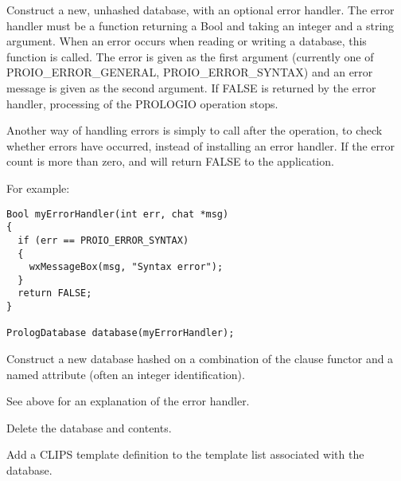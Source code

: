 

Construct a new, unhashed database, with an optional error handler. The
error handler must be a function returning a Bool and taking an integer and a string
argument. When an error occurs when reading or writing a database, this function is
called. The error is given as the first argument (currently one of PROIO\_ERROR\_GENERAL,
PROIO\_ERROR\_SYNTAX) and an error message is given as the second argument. If FALSE
is returned by the error handler, processing of the PROLOGIO operation stops.

Another way of handling errors is simply to call  after
the operation, to check whether errors have occurred, instead of installing an error handler.
If the error count is more than zero,  and  will return FALSE to
the application.

For example:

\begin{verbatim}
Bool myErrorHandler(int err, chat *msg)
{
  if (err == PROIO_ERROR_SYNTAX)
  {
    wxMessageBox(msg, "Syntax error");
  }
  return FALSE;
}

PrologDatabase database(myErrorHandler);
\end{verbatim}



Construct a new database hashed on a combination of the clause functor and
a named attribute (often an integer identification).

See above for an explanation of the error handler.



Delete the database and contents.



Add a CLIPS template definition to the template list associated with the
database.


